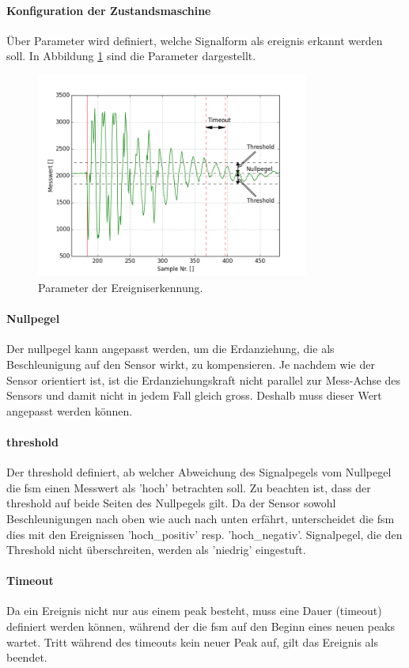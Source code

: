 \paragraph{Konfiguration der Zustandsmaschine}
 Über Parameter wird definiert, welche Signalform als \gls{ereignis} erkannt werden soll. In Abbildung \ref{fig.impact_detection_params} sind die Parameter dargestellt. 
\begin{figure}
	\centering
	\includegraphics[width=0.8\textwidth]{images/impact_params.png}
	\caption{Parameter der Ereigniserkennung.}
	\label{fig.impact_detection_params}
\end{figure}
\paragraph{Nullpegel} Der \gls{nullpegel} kann angepasst werden, um die Erdanziehung, die als Beschleunigung auf den Sensor wirkt, zu kompensieren. Je nachdem wie der Sensor orientiert ist, ist die Erdanziehungskraft nicht parallel zur Mess-Achse des Sensors und damit nicht in jedem Fall gleich gross. Deshalb muss dieser Wert angepasst werden können.
\paragraph{threshold} Der \gls{threshold} definiert, ab welcher Abweichung des Signalpegels vom Nullpegel die \gls{fsm} einen Messwert als 'hoch' betrachten soll. Zu beachten ist, dass der \gls{threshold} auf beide Seiten des Nullpegels gilt. Da der Sensor sowohl Beschleunigungen nach oben wie auch nach unten erfährt, unterscheidet die \gls{fsm} dies mit den Ereignissen 'hoch\_positiv' resp. 'hoch\_negativ'. Signalpegel, die den Threshold nicht überschreiten, werden als 'niedrig' eingestuft.
\paragraph{Timeout} Da ein Ereignis nicht nur aus einem \gls{peak} besteht, muss eine Dauer (\gls{timeout}) definiert werden können, während der die \gls{fsm} auf den Beginn eines neuen \gls{peak}s wartet. Tritt während des \gls{timeout}s kein neuer Peak auf, gilt das Ereignis als beendet.

